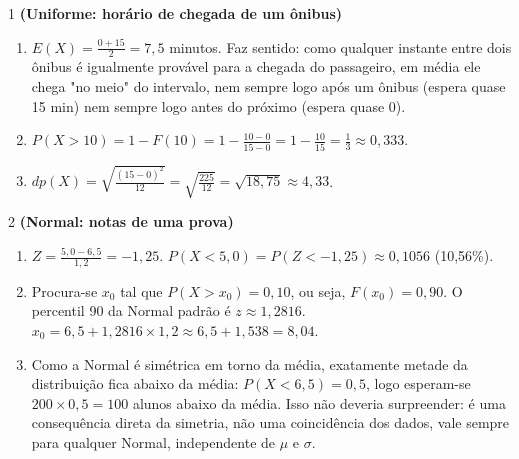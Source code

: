 \documentclass[11pt]{article}
\begin{document}

\begin{questao}{1} \textbf{(Uniforme: horário de chegada de um ônibus)}
\begin{solucao}
\begin{enumerate}[label=(\alph*)]
  \item $E(X)=\frac{0+15}{2}=7{,}5$ minutos. Faz sentido: como qualquer instante entre dois
    ônibus é igualmente provável para a chegada do passageiro, em média ele chega "no meio" do
    intervalo, nem sempre logo após um ônibus (espera quase 15 min) nem sempre logo antes do
    próximo (espera quase 0).
  \item $P(X>10) = 1-F(10) = 1-\frac{10-0}{15-0} = 1-\frac{10}{15} = \frac13\approx0{,}333$.
  \item $dp(X) = \sqrt{\frac{(15-0)^2}{12}} = \sqrt{\frac{225}{12}} = \sqrt{18{,}75}\approx4{,}33$.
\end{enumerate}
\end{solucao}
\end{questao}

\begin{questao}{2} \textbf{(Normal: notas de uma prova)}
\begin{solucao}
\begin{enumerate}[label=(\alph*)]
  \item $Z=\frac{5{,}0-6{,}5}{1{,}2}=-1{,}25$. $P(X<5{,}0)=P(Z<-1{,}25)\approx0{,}1056$
    (10,56\%).
  \item Procura-se $x_0$ tal que $P(X>x_0)=0{,}10$, ou seja, $F(x_0)=0{,}90$. O percentil 90 da
    Normal padrão é $z\approx1{,}2816$. $x_0 = 6{,}5+1{,}2816\times1{,}2 \approx 6{,}5+1{,}538 =
    8{,}04$.
  \item Como a Normal é simétrica em torno da média, exatamente metade da distribuição fica
    abaixo da média: $P(X<6{,}5)=0{,}5$, logo esperam-se $200\times0{,}5=100$ alunos abaixo da
    média. Isso não deveria surpreender: é uma consequência direta da simetria, não uma
    coincidência dos dados, vale sempre para qualquer Normal, independente de $\mu$ e $\sigma$.
\end{enumerate}
\end{solucao}
\end{questao}
\end{document}
